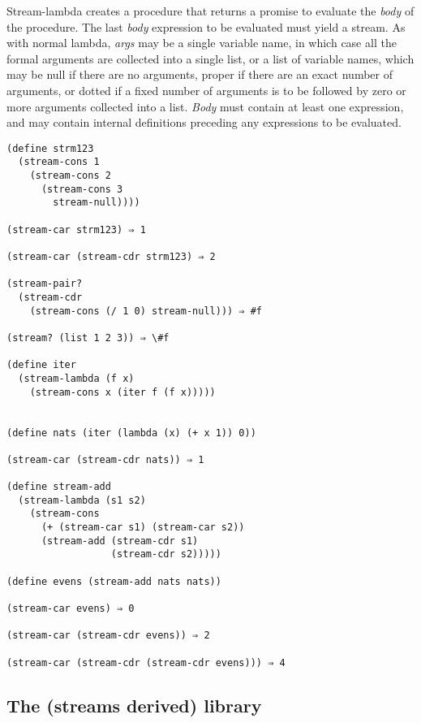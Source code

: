 \begin{entry}{%
  }

  Stream-lambda creates a procedure that returns a promise to evaluate
  the \emph{body} of the procedure. The last \emph{body} expression to
  be evaluated must yield a stream. As with normal lambda, \emph{args}
  may be a single variable name, in which case all the formal
  arguments are collected into a single list, or a list of variable
  names, which may be null if there are no arguments, proper if there
  are an exact number of arguments, or dotted if a fixed number of
  arguments is to be followed by zero or more arguments collected into
  a list. \emph{Body} must contain at least one expression, and may
  contain internal definitions preceding any expressions to be
  evaluated.

\begin{verbatim}
(define strm123
  (stream-cons 1
    (stream-cons 2
      (stream-cons 3
        stream-null))))

(stream-car strm123) ⇒ 1

(stream-car (stream-cdr strm123) ⇒ 2

(stream-pair?
  (stream-cdr
    (stream-cons (/ 1 0) stream-null))) ⇒ #f

(stream? (list 1 2 3)) ⇒ \#f

(define iter
  (stream-lambda (f x)
    (stream-cons x (iter f (f x)))))


(define nats (iter (lambda (x) (+ x 1)) 0))

(stream-car (stream-cdr nats)) ⇒ 1

(define stream-add
  (stream-lambda (s1 s2)
    (stream-cons
      (+ (stream-car s1) (stream-car s2))
      (stream-add (stream-cdr s1)
                  (stream-cdr s2)))))

(define evens (stream-add nats nats))

(stream-car evens) ⇒ 0

(stream-car (stream-cdr evens)) ⇒ 2

(stream-car (stream-cdr (stream-cdr evens))) ⇒ 4
\end{verbatim}
\end{entry}

\subsection{The (streams derived)
library}\label{the-streams-derived-library}

